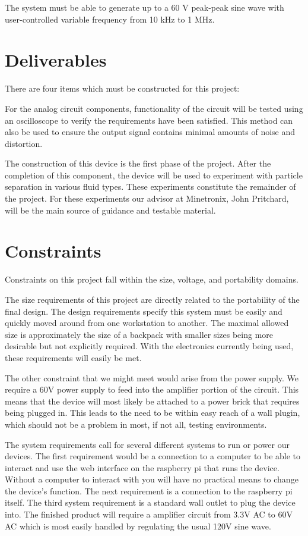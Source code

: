 \documentclass{article}	%
\begin{document}
\begin{multicols}{2}
The system must be able to generate up to a 60 V peak-peak sine wave with
user-controlled variable frequency from 10 kHz to 1 MHz. 

\section{Deliverables}
There are four items which must be constructed for this project:

For the analog circuit components,
functionality of the circuit will be tested
using an oscilloscope to verify 
the requirements have been satisfied.
This method can also be used to ensure 
the output signal contains minimal amounts of noise and distortion. 

The construction of this device is the first phase of the project.
After the completion of this component,
the device will be used 
to experiment with particle separation in various fluid types.
These experiments constitute the remainder of the project.
For these experiments our advisor at Minetronix, John Pritchard, 
will be the main source of guidance and testable material. 

\section{Constraints}
Constraints on this project fall within the size, voltage, and portability domains.

The size requirements of this project are directly related 
to the portability of the final design.
The design requirements specify this system must be easily and quickly moved around from one workstation to another.
The maximal allowed size is approximately 
the size of a backpack 
with smaller sizes being more desirable
but not explicitly required.
With the electronics currently being used,
these requirements will easily be met.

The other constraint that we might meet would arise from the power supply. We require a 60V power supply to feed into the amplifier portion of the circuit. This means that the device will most likely be attached to a power brick that requires being plugged in. This leads to the need to be within easy reach of a wall plugin, which should not be a problem in most, if not all, testing environments. 

The system requirements call for several different systems to run or power our devices. The first requirement would be a connection to a computer to be able to interact and use the web interface on the raspberry pi that runs the device. Without a computer to interact with you will have no practical means to change the device's function. The next requirement is a connection to the raspberry pi itself. The third system requirement is a standard wall outlet to plug the device into. The finished product will require a amplifier circuit from 3.3V AC to 60V AC which is most easily handled by regulating the usual 120V sine wave. 


\end{multicols}
\end{document}
